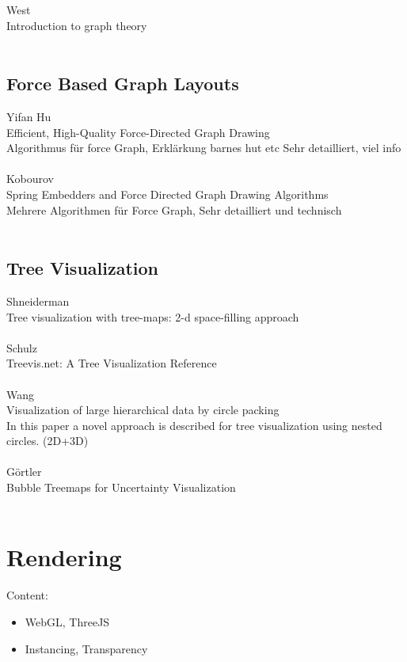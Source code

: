 West\\
Introduction to graph theory\\
\\

\subsection{Force Based Graph Layouts}

Yifan Hu\\
Efficient, High-Quality Force-Directed Graph Drawing\\
Algorithmus für force Graph,  Erklärkung barnes hut etc Sehr detailliert, viel info\\
\\
Kobourov\\
Spring Embedders and Force Directed Graph Drawing Algorithms\\
Mehrere Algorithmen für Force Graph, Sehr detailliert und technisch \\
\\

\subsection{Tree Visualization}

Shneiderman \\
Tree visualization with tree-maps: 2-d space-filling approach\\
\\
Schulz\\
Treevis.net: A Tree Visualization Reference\\
\\
Wang\\
Visualization of large hierarchical data by circle packing\\
In this paper a novel approach is described for tree visualization using nested circles. (2D+3D)\\
\\
Görtler\\
Bubble Treemaps for Uncertainty Visualization\\
\\





\section{Rendering}

Content: 
\begin{itemize}
    \item WebGL, ThreeJS
    \item Instancing, Transparency
\end{itemize}

